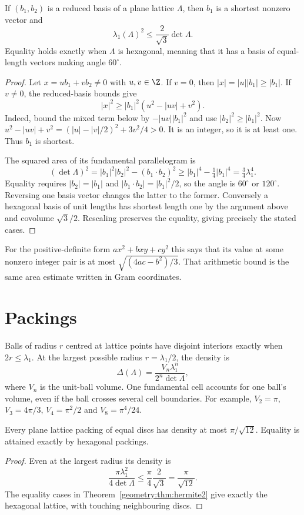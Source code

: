 \begin{theorem}\label{geometry:thm:hermite2}
If $(b_1,b_2)$ is a reduced basis of a plane lattice $\Lambda$, then $b_1$
is a shortest nonzero vector and
\[
 \lambda_1(\Lambda)^2\le\frac2{\sqrt3}\det\Lambda.
\]
Equality holds exactly when $\Lambda$ is hexagonal, meaning that it has
a basis of equal-length vectors making angle $60^\circ$.
\end{theorem}
\begin{proof}
Let $x=ub_1+vb_2\ne0$ with $u,v\in\Z$.
If $v=0$, then $|x|=|u||b_1|\ge|b_1|$.
If $v\ne0$, the reduced-basis bounds give
\[
 |x|^2\ge|b_1|^2(u^2-|uv|+v^2).
\]
Indeed, bound the mixed term below by $-|uv||b_1|^2$ and use
$|b_2|^2\ge|b_1|^2$.
Now
$u^2-|uv|+v^2=(|u|-|v|/2)^2+3v^2/4>0$.
It is an integer, so it is at least one. Thus $b_1$ is shortest.

The squared area of its fundamental parallelogram is
\[
 (\det\Lambda)^2
 =|b_1|^2|b_2|^2-(b_1\cdot b_2)^2
 \ge |b_1|^4-\tfrac14|b_1|^4=\tfrac34\lambda_1^4.
\]
Equality requires $|b_2|=|b_1|$ and
$|b_1\cdot b_2|=|b_1|^2/2$, so the angle is $60^\circ$ or
$120^\circ$. Reversing one basis vector changes the latter to the
former. Conversely a hexagonal basis of unit lengths has shortest
length one by the argument above and covolume $\sqrt3/2$.
Rescaling preserves the equality, giving precisely the stated cases.
\end{proof}

For the positive-definite form $ax^2+bxy+cy^2$ this says that its value
at some nonzero integer pair is at most $\sqrt{(4ac-b^2)/3}$.
That arithmetic bound is the same area estimate written in Gram coordinates.

\section{Packings}

Balls of radius $r$ centred at lattice points have disjoint interiors
exactly when $2r\le\lambda_1$. At the largest possible radius
$r=\lambda_1/2$, the density is
\[
 \Delta(\Lambda)=\frac{V_n\lambda_1^n}{2^n\det\Lambda},
\]
where $V_n$ is the unit-ball volume. One fundamental cell accounts for
one ball's volume, even if the ball crosses several cell boundaries.
For example, $V_2=\pi$, $V_3=4\pi/3$, $V_4=\pi^2/2$ and
$V_8=\pi^4/24$.

\begin{corollary}\label{geometry:cor:hexdensity}
Every plane lattice packing of equal discs has density at most
$\pi/\sqrt{12}$. Equality is attained exactly by hexagonal packings.
\end{corollary}
\begin{proof}
Even at the largest radius its density is
\[
 \frac{\pi\lambda_1^2}{4\det\Lambda}
 \le\frac\pi4\frac2{\sqrt3}=\frac\pi{\sqrt{12}}.
\]
The equality cases in Theorem~\ref{geometry:thm:hermite2} give exactly
the hexagonal lattice, with touching neighbouring discs.
\end{proof}

